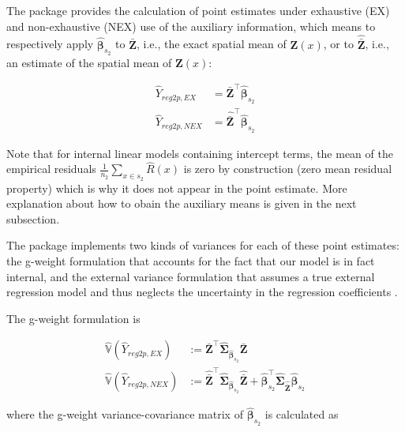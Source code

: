 \documentclass[article]{jss}
\newcommand{\var}{\mathbb{V}}
\begin{document}
The package provides the calculation of point estimates under exhaustive (EX) and non-exhaustive (NEX) use of the auxiliary information, which means to respectively apply $\hat{\pmb{\beta}}_{s_2}$ to $\bar{\pmb{Z}}$, i.e., the exact spatial mean of $\pmb{Z}(x)$, or to $\hat{\bar{\pmb{Z}}}$, i.e., an estimate of the spatial mean of $\pmb{Z}(x)$:


\begin{subequations}\label{eq:pointest_2p_reg}
\begin{align}
  \hat{Y}_{reg2p,EX} & =\bar{\pmb{Z}}^{\top}\hat{\pmb{\beta}}_{s_2} \label{eq:pointest_2p_reg_ex}\\
  \hat{Y}_{reg2p,NEX} & =\hat{\bar{\pmb{Z}}}^{\top}\hat{\pmb{\beta}}_{s_2} \label{eq:pointest_2p_reg_nex}
\end{align}
\end{subequations}

Note that for internal linear models containing intercept terms, the mean of the empirical residuals $\frac{1}{n_2}\sum_{x\in{s_2}}\hat{R}(x)$ is zero by construction (zero mean residual property) which is why it does not appear in the point estimate. More explanation about how to obain the auxiliary means is given in the next subsection.

The  package implements two kinds of variances for each of these point estimates: the g-weight formulation that accounts for the fact that our model is in fact internal, and the external variance formulation that assumes a true external regression model and thus neglects the uncertainty in the regression coefficients \citep{mandallaz2016}.

The g-weight formulation is

\begin{subequations}\label{eq:gw_var_2p_reg}
\begin{align}
  \hat{\var}(\hat{Y}_{reg2p,EX}) & :=\bar{\pmb{Z}}^{\top}\hat{\pmb{\Sigma}}_{\hat{\pmb{\beta}}_{s_2}}\bar{\pmb{Z}} \label{eq:gw_var_2p_reg_ex}\\
  \hat{\var}(\hat{Y}_{reg2p,NEX}) & :=
  \hat{\bar{\pmb{Z}}}^{\top}\hat{\pmb{\Sigma}}_{\hat{\pmb{\beta}}_{s_2}}\hat{\bar{\pmb{Z}}}
  + \hat{\pmb{\beta}}_{s_2}^{\top}\hat{\pmb{\Sigma}}_{\hat{\bar{\pmb{Z}}}}\hat{\pmb{\beta}}_{s_2} \label{eq:gw_var_2p_reg_nex}
\end{align}
\end{subequations}

where the g-weight variance-covariance matrix of $\hat{\pmb{\beta}}_{s_2}$ is calculated as
\end{document}

